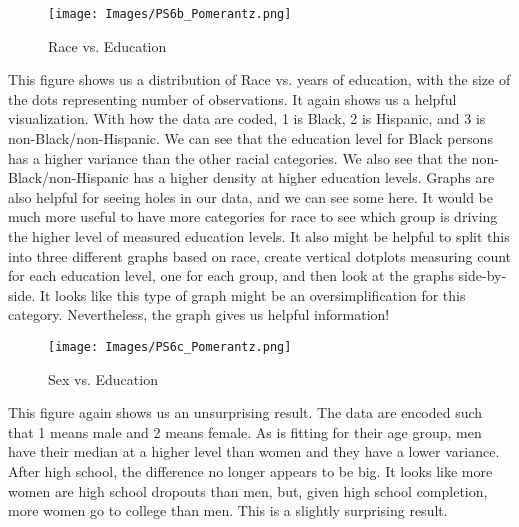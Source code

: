 \documentclass{article}
\begin{document}
\begin{figure}[htp]
    \centering
    \texttt{[image: Images/PS6b\_Pomerantz.png]}
    \caption{Race vs. Education}
    \label{fig:comp1}
\end{figure}

This figure shows us a distribution of Race vs. years of education, with the size of the dots representing number of observations. It again shows us a helpful visualization. With how the data are coded, 1 is Black, 2 is Hispanic, and 3 is non-Black/non-Hispanic. We can see that the education level for Black persons has a higher variance than the other racial categories. We also see that the non-Black/non-Hispanic has a higher density at higher education levels. Graphs are also helpful for seeing holes in our data, and we can see some here. It would be much more useful to have more categories for race to see which group is driving the higher level of measured education levels. It also might be helpful to split this into three different graphs based on race, create vertical dotplots measuring count for each education level, one for each group, and then look at the graphs side-by-side. It looks like this type of graph might be an oversimplification for this category. Nevertheless, the graph gives us helpful information!

\begin{figure}[htp]
    \centering
    \texttt{[image: Images/PS6c\_Pomerantz.png]}
    \caption{Sex vs. Education}
    \label{fig:comp2}
\end{figure}

This figure again shows us an unsurprising result. The data are encoded such that 1 means male and 2 means female. As is fitting for their age group, men have their median at a higher level than women and they have a lower variance. After high school, the difference no longer appears to be big. It looks like more women are high school dropouts than men, but, given high school completion, more women go to college than men. This is a slightly surprising result.
\end{document}

